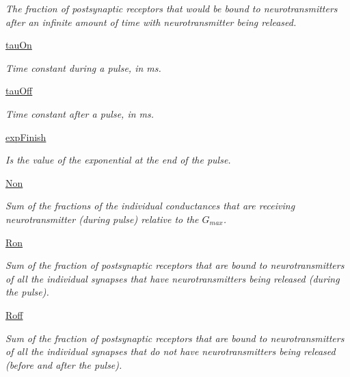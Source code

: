 \begin{DoxyCompactItemize}
\begin{DoxyCompactList}\small\item\em The fraction of postsynaptic receptors that would be bound to neurotransmitters after an infinite amount of time with neurotransmitter being released. \end{DoxyCompactList}\item 
\hyperlink{class_synapse_1_1_synapse_aae46f8edd1e94ea2ab51e3612afd3a3f}{tau\-On}
\begin{DoxyCompactList}\small\item\em Time constant during a pulse, in ms. \end{DoxyCompactList}\item 
\hyperlink{class_synapse_1_1_synapse_afd5638a223c3fdcc672002dbced7bed0}{tau\-Off}
\begin{DoxyCompactList}\small\item\em Time constant after a pulse, in ms. \end{DoxyCompactList}\item 
\hyperlink{class_synapse_1_1_synapse_aa9ae256b272ceb8e9e4a931a9cd5d163}{exp\-Finish}
\begin{DoxyCompactList}\small\item\em Is the value of the exponential at the end of the pulse. \end{DoxyCompactList}\item 
\hyperlink{class_synapse_1_1_synapse_af8779bbc2ee2c5ae7747ee5cfbcf112e}{Non}
\begin{DoxyCompactList}\small\item\em Sum of the fractions of the individual conductances that are receiving neurotransmitter (during pulse) relative to the $G_{max}$. \end{DoxyCompactList}\item 
\hyperlink{class_synapse_1_1_synapse_ae759c51a7196995510fe3eb086050c76}{Ron}
\begin{DoxyCompactList}\small\item\em Sum of the fraction of postsynaptic receptors that are bound to neurotransmitters of all the individual synapses that have neurotransmitters being released (during the pulse). \end{DoxyCompactList}\item 
\hyperlink{class_synapse_1_1_synapse_ae67ffbbd23cd9c56f20bda9e8e040663}{Roff}
\begin{DoxyCompactList}\small\item\em Sum of the fraction of postsynaptic receptors that are bound to neurotransmitters of all the individual synapses that do not have neurotransmitters being released (before and after the pulse). \end{DoxyCompactList}\item 

\end{DoxyCompactItemize}
